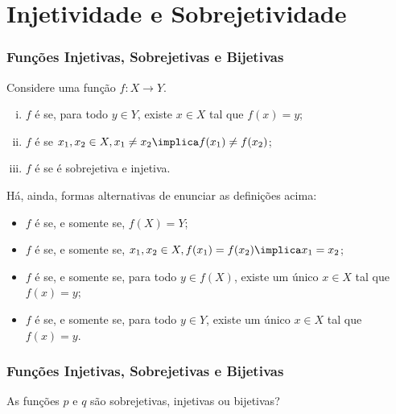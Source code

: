 \section{Injetividade e Sobrejetividade}
\begin{frame}
\frametitle{Funções Injetivas, Sobrejetivas e Bijetivas} 


\begin{definicao}
Considere uma função $f: X \to Y$.
\begin{enumerate}[(i)]
	\item $f$ é  se, para todo $y \in Y$, existe $x
	\in X$ tal que $f(x) = y$;
	\item $f$ é  se $x_1, x_2 \in X, x_1 \neq x_2
	\implica f(x_1) \neq f(x_2)$;
	\item $f$ é  se é sobrejetiva e injetiva.
\end{enumerate}
\end{definicao}\pause
Há, ainda, formas alternativas de enunciar as definições acima:
\begin{itemize}
	\item $f$ é  se, e somente se, $f(X) = Y$;
	\item $f$ é  se, e somente se, $x_1, x_2 \in X, f(x_1) = f(x_2)
	\implica x_1 = x_2 $;
	\item $f$ é  se, e somente se, para todo $y \in
	f(X)$, existe um único $x \in X$ tal que $f(x) = y$;
	\item $f$ é  se, e somente se, para todo $y \in Y$,
	existe um único $x \in X$ tal que $f(x) = y$.
\end{itemize}
\end{frame}




\begin{frame}
\frametitle{Funções Injetivas, Sobrejetivas e Bijetivas} 

\begin{exemplo}\label{pqbij}
As funções $p$ e $q$ são sobrejetivas, injetivas ou bijetivas?
\end{exemplo}
\end{frame}




